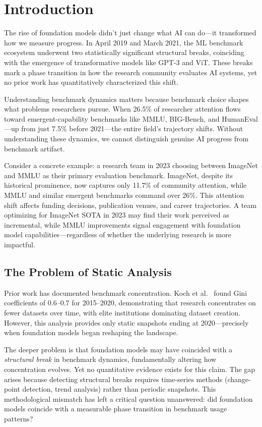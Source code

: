 \section{Introduction}

The rise of foundation models didn't just change what AI can do---it transformed how we measure progress. In April 2019 and March 2021, the ML benchmark ecosystem underwent two statistically significant structural breaks, coinciding with the emergence of transformative models like GPT-3 and ViT. These breaks mark a phase transition in how the research community evaluates AI systems, yet no prior work has quantitatively characterized this shift.

Understanding benchmark dynamics matters because benchmark choice shapes what problems researchers pursue. When 26.5\% of researcher attention flows toward emergent-capability benchmarks like MMLU, BIG-Bench, and HumanEval---up from just 7.5\% before 2021---the entire field's trajectory shifts. Without understanding these dynamics, we cannot distinguish genuine AI progress from benchmark artifact.

Consider a concrete example: a research team in 2023 choosing between ImageNet and MMLU as their primary evaluation benchmark. ImageNet, despite its historical prominence, now captures only 11.7\% of community attention, while MMLU and similar emergent benchmarks command over 26\%. This attention shift affects funding decisions, publication venues, and career trajectories. A team optimizing for ImageNet SOTA in 2023 may find their work perceived as incremental, while MMLU improvements signal engagement with foundation model capabilities---regardless of whether the underlying research is more impactful.

\subsection{The Problem of Static Analysis}

Prior work has documented benchmark concentration. Koch et al.~\cite{koch2021reduced} found Gini coefficients of 0.6--0.7 for 2015--2020, demonstrating that research concentrates on fewer datasets over time, with elite institutions dominating dataset creation. However, this analysis provides only static snapshots ending at 2020---precisely when foundation models began reshaping the landscape.

The deeper problem is that foundation models may have coincided with a \emph{structural break} in benchmark dynamics, fundamentally altering how concentration evolves. Yet no quantitative evidence exists for this claim. The gap arises because detecting structural breaks requires time-series methods (change-point detection, trend analysis) rather than periodic snapshots. This methodological mismatch has left a critical question unanswered: did foundation models coincide with a measurable phase transition in benchmark usage patterns?

